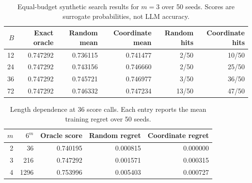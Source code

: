 \begin{table}[htbp]
\centering\small
\caption{Equal-budget synthetic search results for $m=3$ over 50 seeds. Scores are surrogate probabilities, not LLM accuracy.}
\label{tab:main_results}
\begin{tabular}{rrrrrr}
\toprule
$B$ & Exact oracle & Random mean & Coordinate mean & Random hits & Coordinate hits \\
\midrule
12 & 0.747292 & 0.736115 & 0.741477 & 2/50 & 10/50 \\
24 & 0.747292 & 0.743156 & 0.746660 & 2/50 & 25/50 \\
36 & 0.747292 & 0.745721 & 0.746977 & 3/50 & 36/50 \\
72 & 0.747292 & 0.746332 & 0.747234 & 13/50 & 47/50 \\
\bottomrule
\end{tabular}
\end{table}
\begin{table}[htbp]
\centering\small
\caption{Length dependence at 36 score calls. Each entry reports the mean training regret over 50 seeds.}
\label{tab:length}
\begin{tabular}{rrrrr}
\toprule
$m$ & $6^m$ & Oracle score & Random regret & Coordinate regret \\
\midrule
2 & 36 & 0.740195 & 0.000815 & 0.000000 \\
3 & 216 & 0.747292 & 0.001571 & 0.000315 \\
4 & 1296 & 0.753996 & 0.005403 & 0.000727 \\
\bottomrule
\end{tabular}
\end{table}

